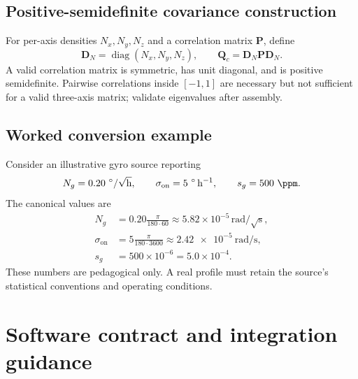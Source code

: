 \documentclass[11pt,oneside,headings=big]{scrreprt}
\newcommand{\diag}{\operatorname{diag}}
\newcommand{\mat}[1]{\bm{#1}}
\begin{document}
    \section{Positive-semidefinite covariance construction}
    For per-axis densities \(N_x,N_y,N_z\) and a correlation matrix
    \(\mat P\), define
    \begin{equation}
        \mat D_N=\diag(N_x,N_y,N_z),
        \qquad
        \mat Q_c=\mat D_N\mat P\mat D_N.
        \label{eq:covariance-construction}
    \end{equation}
    A valid correlation matrix is symmetric, has unit diagonal, and is positive
    semidefinite. Pairwise correlations inside \([-1,1]\) are necessary but not
    sufficient for a valid three-axis matrix; validate eigenvalues after assembly.


    \section{Worked conversion example}
    Consider an illustrative gyro source reporting
    \begin{equation}
        N_g=0.20\ \si{\degree}/\sqrt{\si{\hour}},
        \qquad
        \sigma_{\mathrm{on}}=5\ \si{\degree\per\hour},
        \qquad
        s_g=500\ \si{\ppm}.
    \end{equation}
    The canonical values are
    \begin{align}
        N_g
        &=0.20\frac{\pi}{180\cdot60}
        \approx5.82\times10^{-5}\,\si{\radian}/\sqrt{\si{\second}},\\
        \sigma_{\mathrm{on}}
        &=5\frac{\pi}{180\cdot3600}
        \approx\SI{2.42e-5}{\radian\per\second},\\
        s_g&=500\times10^{-6}=5.0\times10^{-4}.
    \end{align}
    These numbers are pedagogical only. A real profile must retain the source's
    statistical conventions and operating conditions.


    \chapter{Software contract and integration guidance}
    \label{chap:software}
\end{document}
